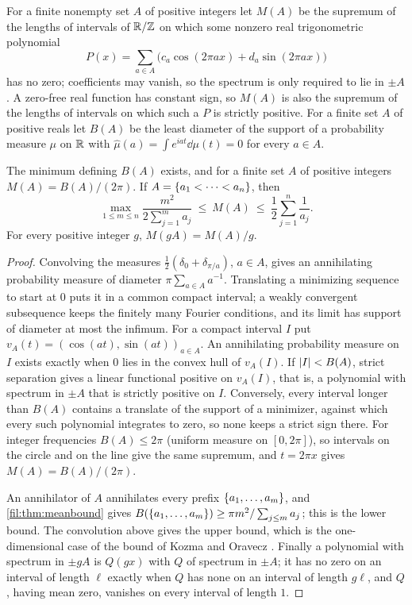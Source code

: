For a finite nonempty set $A$ of positive integers let $M(A)$ be the supremum of the lengths of intervals of
$\mathbb{R}/\mathbb{Z}$ on which some nonzero real trigonometric polynomial
\[
 P(x)=\sum_{a\in A}\bigl(c_a\cos(2\pi ax)+d_a\sin(2\pi ax)\bigr)
\]
has no zero; coefficients may vanish, so the spectrum is only required to lie in $\pm A$. A zero-free real
function has constant sign, so $M(A)$ is also the supremum of the lengths of intervals on which such a $P$ is
strictly positive. For a finite set $A$ of positive reals let $B(A)$ be the least diameter of the support of a
probability measure $\mu$ on $\mathbb{R}$ with $\widehat\mu(a)=\int e^{iat}\dd\mu(t)=0$ for every $a\in A$.

\begin{proposition}\label{zfg:prop:duality}
The minimum defining $B(A)$ exists, and for a finite set $A$ of positive integers $M(A)=B(A)/(2\pi)$. If
$A=\{a_1<\dots<a_n\}$, then
\[
 \max_{1\le m\le n}\frac{m^2}{2\sum_{j=1}^ma_j}\ \le\ M(A)\ \le\ \frac12\sum_{j=1}^n\frac1{a_j}.
\]
For every positive integer $g$, $M(gA)=M(A)/g$.
\end{proposition}

\begin{proof}
Convolving the measures $\tfrac12(\delta_0+\delta_{\pi/a})$, $a\in A$, gives an annihilating probability measure of
diameter $\pi\sum_{a\in A}a^{-1}$. Translating a minimizing sequence to start at $0$ puts it in a common compact
interval; a weakly convergent subsequence keeps the finitely many Fourier conditions, and its limit has
support of diameter at most the infimum. For a compact interval $I$ put $v_A(t)=(\cos(at),\sin(at))_{a\in A}$. An
annihilating probability measure on $I$ exists exactly when $0$ lies in the convex hull of $v_A(I)$. If
$\lvert I\rvert<B(A)$, strict separation gives a linear functional positive on $v_A(I)$, that is, a polynomial with
spectrum in $\pm A$ that is strictly positive on $I$. Conversely, every interval longer than $B(A)$ contains a
translate of the support of a minimizer, against which every such polynomial integrates to zero, so none keeps
a strict sign there. For integer frequencies $B(A)\le2\pi$ (uniform measure on $[0,2\pi]$), so intervals on the
circle and on the line give the same supremum, and $t=2\pi x$ gives $M(A)=B(A)/(2\pi)$.

An annihilator of $A$ annihilates every prefix $\{a_1,\dots,a_m\}$, and \cref{fil:thm:meanbound} gives
$B(\{a_1,\dots,a_m\})\ge\pi m^2/\sum_{j\le m}a_j$; this is the lower bound. The convolution above gives the upper
bound, which is the one-dimensional case of the bound of Kozma and Oravecz \cite{KozmaOravecz2003Gaps}. Finally a
polynomial with spectrum in $\pm gA$ is $Q(gx)$ with $Q$ of spectrum in $\pm A$; it has no zero on an interval of
length $\ell$ exactly when $Q$ has none on an interval of length $g\ell$, and $Q$, having mean zero, vanishes on
every interval of length $1$.
\end{proof}

